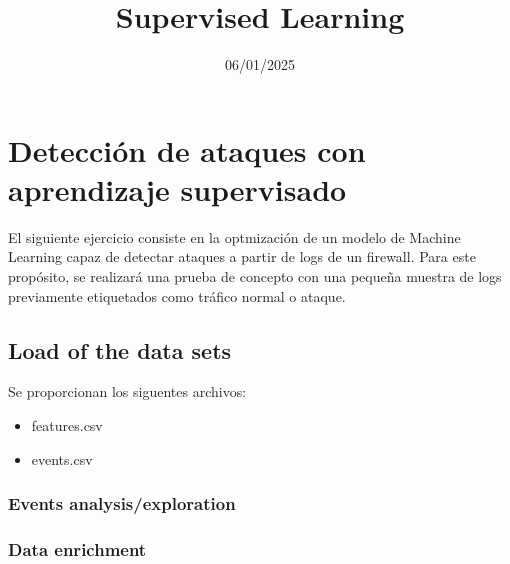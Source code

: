 \documentclass[
]{article}
\title{Supervised Learning}
\author{}
\date{\vspace{-2.5em}06/01/2025}
\providecommand{\tightlist}{%
  \setlength{\itemsep}{0pt}\setlength{\parskip}{0pt}}
\begin{document}
\maketitle

\section{Detección de ataques con aprendizaje
supervisado}\label{detecciuxf3n-de-ataques-con-aprendizaje-supervisado}

El siguiente ejercicio consiste en la optmización de un modelo de
Machine Learning capaz de detectar ataques a partir de logs de un
firewall. Para este propósito, se realizará una prueba de concepto con
una pequeña muestra de logs previamente etiquetados como tráfico normal
o ataque.

\subsection{Load of the data sets}\label{load-of-the-data-sets}

Se proporcionan los siguentes archivos:

\begin{itemize}
\tightlist
\item
  features.csv
\item
  events.csv
\end{itemize}

\subsubsection{Events
analysis/exploration}\label{events-analysisexploration}

\subsubsection{Data enrichment}\label{data-enrichment}
\end{document}
